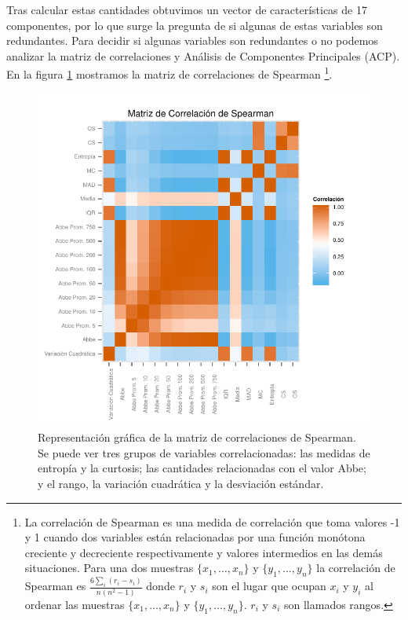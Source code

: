 \documentclass[letterpaper,12pt]{book}
\begin{document}
Tras calcular estas cantidades obtuvimos un vector de características de 17 componentes, por lo que surge la pregunta de si algunas de estas variables son redundantes. Para decidir si algunas variables son redundantes o no podemos analizar la matriz de correlaciones y Análisis de Componentes Principales (ACP). En la figura \ref{fig:correlacionSpearman} mostramos la matriz de correlaciones de Spearman \footnote{La correlación de Spearman es una medida de correlación que toma valores -1 y 1 cuando dos variables están relacionadas por una función monótona creciente y decreciente respectivamente y valores intermedios en las demás situaciones. Para una dos muestras $\{x_1,\dots,x_n\}$ y $\{y_1,\dots,y_n\}$  la correlación de Spearman es $\frac{6\sum_i (r_i-s_i)}{n(n^2-1)}$ donde $r_i$ y $s_i$ son el lugar que ocupan $x_i$ y $y_i$ al ordenar las muestras  $\{x_1,\dots,x_n\}$ y $\{y_1,\dots,y_n\}$. $r_i$ y $s_i$ son llamados rangos.}. 

\begin{figure}
  \centering
  \includegraphics[width = \textwidth]{./img/CClasificacion/correlacionSpearman.pdf}
  \caption{Representación gráfica de la matriz de correlaciones de Spearman. Se puede ver tres grupos de variables correlacionadas: las medidas de entropía y la curtosis; las cantidades relacionadas con el valor Abbe; y el rango, la variación cuadrática y la desviación estándar. }
  \label{fig:correlacionSpearman}
  \centering
\end{figure}
\end{document}
